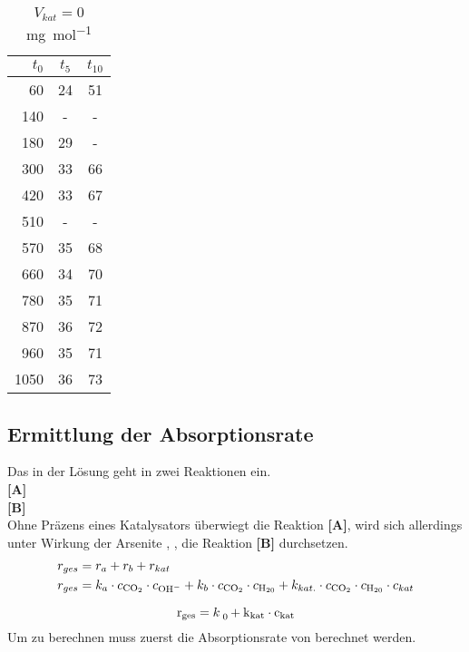 \documentclass{article}
\begin{document}
\begin{onehalfspace}
\begin{table}[!htbp]
\parbox{.45\linewidth}{
\centering

\begin{tabular}{rcc}
\hline
 $t_0$ & $t_5$  & $t_{10}$ \\
\hline
60 & 24 & 51 \\
140 & - & - \\
180 & 29 & - \\
300 & 33 & 66 \\
420 & 33 & 67 \\
510 & - & - \\
570 & 35 & 68 \\
660 & 34 & 70 \\
780 & 35 & 71 \\
870 & 36 & 72 \\
960 & 35 & 71 \\
1050 & 36 & 73 \\
\hline
\end{tabular}
\caption{$V_{kat} = 0$ \si{\milli\gram\per\mol}}
}
\end{table}


\subsection{Ermittlung der Absorptionsrate}
  Das  in der Lösung geht in zwei Reaktionen ein.\\
 \textbf{[A]} \:  \\
 \textbf{[B]} \:  \\

Ohne Präzens eines Katalysators überwiegt die Reaktion \textbf{[A]}, 
wird sich allerdings unter Wirkung der Arsenite , ,
die Reaktion \textbf{[B]} durchsetzen. 
\begin{align}
  r_{ges} &= r _a + r _b + r _{kat}\\
  r_{ges} &= k_a \cdot c_{\ce{CO2}} \cdot c_{\ce{OH-}} + k_b \cdot c_{\ce{CO2}} \cdot c_{\ce{H20}} + k_{kat.} \cdot c_{\ce{CO2}} \cdot c_{\ce{H20}} \cdot c_{kat}   
\end{align}

\begin{equation}
  \ce{r_{ges}} = \ce{k _0} + \ce{k_{kat}} \cdot \ce{c_{kat}}
\end{equation}
Um  zu berechnen muss zuerst die Absorptionsrate von   berechnet werden.


\end{onehalfspace}
\end{document}
